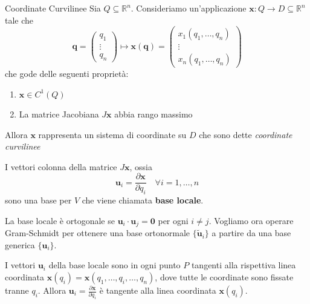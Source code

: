 \begin{definition}{Coordinate Curvilinee}
Sia \(Q \subseteq \mathbb{R}^{n} \). Consideriamo un'applicazione \(\mathbf{x} :
Q \to D \subseteq \mathbb{R}^{n} \) tale che 
\[
  \mathbf{q} = \begin{pmatrix}
      q_{1} \\
      \vdots  \\
      q_n
  \end{pmatrix} \mapsto \mathbf{x} {(\mathbf{q} )} = \begin{pmatrix}
      x_{1}{(q_{1}, \dots, q_{n})} \\
      \vdots \\
      x_{n}{(q_{1}, \dots, q_{n})}
  \end{pmatrix}
\]
che gode delle seguenti proprietà:
\begin{enumerate}[label = \arabic*.]
    \item \(\mathbf{x}  \in C^{1}{(Q)}\) 
    \item La matrice Jacobiana \(J\mathbf{x} \) abbia rango massimo
\end{enumerate}
Allora \(\mathbf{x} \) rappresenta un sistema di coordinate su \(D\) che sono
dette \emph{coordinate curvilinee}
\end{definition}
I vettori colonna della matrice \(J\mathbf{x} \), ossia
\[
  \mathbf{u}_i = \frac{\partial \mathbf{x} }{\partial q_{i}} \quad \forall i =
  1, \dots, n
\]
sono una base per \(V\) che viene chiamata \textbf{base locale}.

La base locale è ortogonale se \(\mathbf{u}_i \cdot \mathbf{u}_j = \mathbf{0} \) per ogni
\(i \neq j\). Vogliamo ora operare Gram-Schmidt per ottenere una base
ortonormale \(\{\tilde{\mathbf{u}}_i\} \) a partire da una base generica
\(\{\mathbf{u}_i\}\). 

\begin{remark}
    I vettori \(\mathbf{u}_i\) della base locale sono in ogni punto \(P\)
    tangenti alla rispettiva linea coordinata \(\mathbf{x} {(q_{i})} = \mathbf{x}(q_{1}, \dots, q_{i},
    \dots, q_{n})\), dove tutte le coordinate sono fissate tranne \(q_{i}\).
    Allora \(\mathbf{u}_i = \frac{\partial \mathbf{x} }{\partial q_{i}}\) è
    tangente alla linea coordinata \(\mathbf{x} {(q_{i})}\).
\end{remark}

